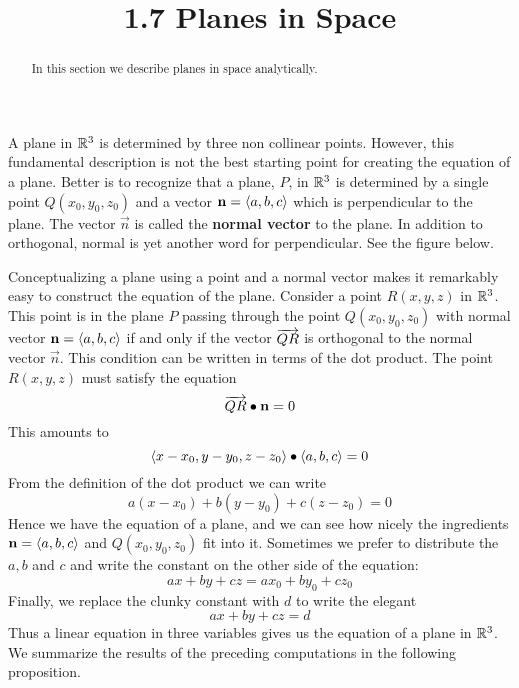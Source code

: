 \documentclass[handout]{ximera}
\title{1.7 Planes in Space}
\begin{document}
\begin{abstract}
In this section we describe planes in space analytically.
\end{abstract}
 
\maketitle

A plane in $\mathbb R^3$ is determined by three non collinear points. 
However, this fundamental description is not the best starting point for creating the equation of a plane.
Better is to recognize that a plane, $P$, in $\mathbb R^3$ is determined by a single point $Q(x_0, y_0, z_0)$ and a 
vector $\mathbf{n} = \left\langle a, b, c\right\rangle$ which is perpendicular to the plane. 
The vector $\vec{n}$ is called the \textbf{normal vector} to the plane.
In addition to orthogonal, normal is yet another word for perpendicular.
See the figure below.

\begin{image}
\end{image}

Conceptualizing a plane using a point and a normal vector makes it remarkably easy to construct the equation of the plane.
Consider a point $R(x, y, z)$ in $\mathbb R^3$.
This point is in the plane $P$ passing through the point $Q(x_0, y_0, z_0)$ with normal vector $\mathbf{n} =\left\langle a, b, c\right\rangle$
if and only if the vector $\overrightarrow{QR}$ is orthogonal to the normal vector $\vec{n}$.
This condition can be written in terms of the dot product.
The point $R(x, y, z)$ must satisfy the equation
\[
\overrightarrow{QR} \bullet \mathbf{n} = 0
\]
This amounts to 
\[
\left\langle x - x_0, y-y_0, z-z_0\right\rangle \bullet \left\langle a, b, c\right\rangle = 0
\]
From the definition of the dot product we can write
\[
a(x-x_0) + b(y-y_0) + c(z-z_0) = 0
\]
Hence we have the equation of a plane, and we can see how nicely the ingredients $\mathbf{n} = \left\langle a,b,c\right\rangle$
and $Q(x_0, y_0, z_0)$ fit into it.
Sometimes we prefer to distribute the $a, b$ and $c$ and write the constant on the other side of the equation:
\[
ax + by + cz = ax_0 + by_0 + cz_0
\]
Finally, we replace the clunky constant with $d$ to write the elegant
\[
ax + by + cz = d
\]
Thus a linear equation in three variables gives us the equation of a plane in $\mathbb R^3$.
We summarize the results of the preceding computations in the following proposition.
\end{document}
